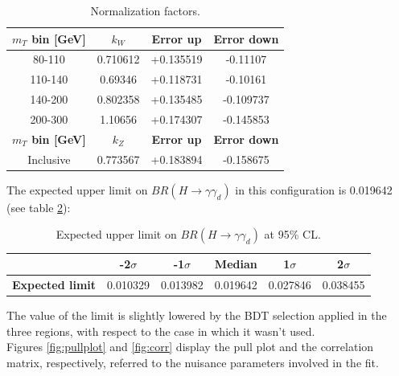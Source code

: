 \begin{table}[h!]
    \centering
    \begin{tabular}{|c|c|c|c|}
    \hline
      \textbf{$m_T$ bin [GeV]} & \textbf{$k_W$} & \textbf{Error up} & \textbf{Error down} \\
    \hline
      80-110 & 0.710612 & +0.135519 & -0.11107  \\
    \hline
      110-140 & 0.69346 & +0.118731 &  -0.10161 \\
    \hline
      140-200   & 0.802358 & +0.135485 & -0.109737 \\
    \hline
     200-300 & 1.10656 & +0.174307 & -0.145853 \\
    \hline
     \textbf{$m_T$ bin [GeV]} & \textbf{$k_Z$} & \textbf{Error up} & \textbf{Error down}\\
    \hline
     Inclusive & 0.773567 & +0.183894 & -0.158675 \\
    \hline
    \end{tabular}
    \caption{Normalization factors.}
    \label{tab:kfactors}
\end{table}

\noindent
The expected upper limit on $BR(H\rightarrow \gamma \gamma_d)$ in this configuration is 0.019642 (see table \ref{tab:limit}):\\

\begin{table}[h!]
    \centering
    \begin{tabular}{|c|c|c|c|c|c|}
    \hline
       & \textbf{-2$\sigma$} & \textbf{-1$\sigma$} & \textbf{Median} & \textbf{1$\sigma$} & \textbf{2$\sigma$} \\
       \hline
     \textbf{Expected limit} & 0.010329 & 0.013982 & 0.019642 & 0.027846 & 0.038455 \\
     \hline
    \end{tabular}
    \caption{Expected upper limit on $BR(H\rightarrow \gamma \gamma_d)$ at 95\% CL.}
    \label{tab:limit}
\end{table}

\vspace{2 cm}
\noindent
The value of the limit is slightly lowered by the BDT selection applied in the three regions, with respect to the case in which it wasn't used.\\
\noindent
Figures \ref{fig:pullplot} and \ref{fig:corr} display the pull plot and the correlation matrix, respectively, referred to the nuisance parameters involved in the fit.

